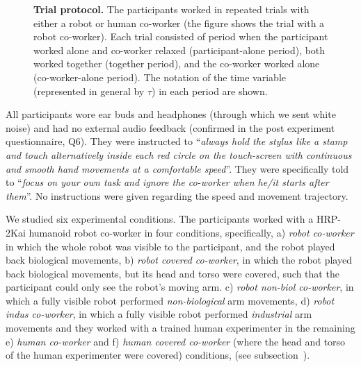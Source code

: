 \documentclass[a4paper, 12pt, oneside]{Thesis}  %
\begin{document}
\begin{figure}[hpt]
	\caption{{\bf Trial protocol.} The participants worked in repeated trials with either a robot or human co-worker (the figure shows the trial with a robot co-worker). Each trial consisted of period when the participant worked alone and co-worker relaxed (participant-alone period), both worked together (together period), and the co-worker worked alone (co-worker-alone period). The notation of the time variable (represented in general by $\tau$) in each period are shown.}
	\label{fig:trialprotocol2}
\end{figure}

All participants wore ear buds and headphones (through which we sent white noise) and had no external audio feedback (confirmed in the post experiment questionnaire, Q6). They were instructed to ``{\it always hold the stylus like a stamp and touch alternatively inside each red circle on the touch-screen with continuous and smooth hand movements at a comfortable speed}''. They were specifically told to ``{\it focus on your own task and ignore the co-worker when he/it starts after them}''. No instructions were given regarding the speed and movement trajectory.

We studied six experimental conditions. The participants worked with a HRP-2Kai humanoid robot co-worker in four conditions, specifically, a) \textit{robot co-worker} in which the whole robot was visible to the participant, and the robot played back biological movements, b) \textit{robot covered co-worker}, in which the robot played back biological movements, but its head and torso were covered, such that the participant could only see the robot's moving arm. c) \textit{robot non-biol co-worker}, in which a fully visible robot performed \textit{non-biological} arm movements, d) \textit{robot indus co-worker}, in which a fully visible robot performed \textit{industrial} arm movements and they worked with a trained human experimenter in the remaining e) \textit{human co-worker} and f) \textit{human covered co-worker} (where the head and torso of the human experimenter were covered) conditions, (see subsection~).
\end{document}
